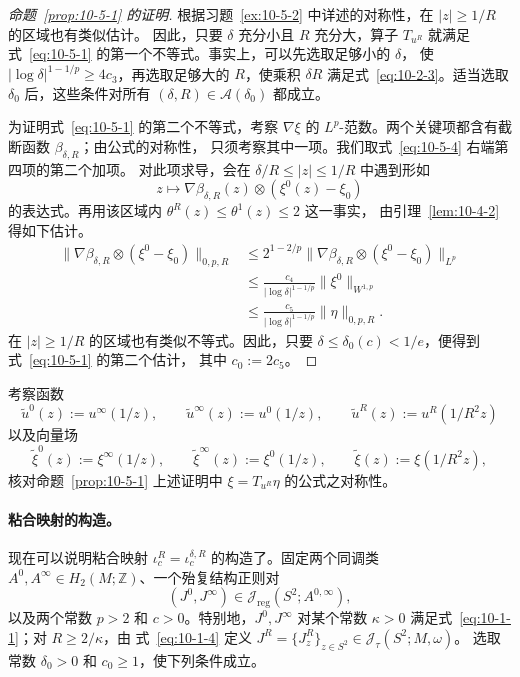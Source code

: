 \begin{proof}[命题~\ref{prop:10-5-1} 的证明]
根据习题~\ref{ex:10-5-2} 中详述的对称性，在 $|z|\ge1/R$ 的区域也有类似估计。
因此，只要 $\delta$ 充分小且 $R$ 充分大，算子 $T_{u^R}$ 就满足
式~\eqref{eq:10-5-1} 的第一个不等式。事实上，可以先选取足够小的 $\delta$，
使 $|\log\delta|^{1-1/p}\ge4c_3$，再选取足够大的 $R$，使乘积 $\delta R$
满足式~\eqref{eq:10-2-3}。适当选取 $\delta_0$ 后，这些条件对所有
$(\delta,R)\in\mathcal A(\delta_0)$ 都成立。

为证明式~\eqref{eq:10-5-1} 的第二个不等式，考察 $\nabla\xi$ 的
$L^p$-范数。两个关键项都含有截断函数 $\beta_{\delta,R}$；由公式的对称性，
只须考察其中一项。我们取式~\eqref{eq:10-5-4} 右端第四项的第二个加项。
对此项求导，会在 $\delta/R\le|z|\le1/R$ 中遇到形如
\[
  z\longmapsto
  \nabla\beta_{\delta,R}(z)\otimes(\xi^0(z)-\xi_0)
\]
的表达式。再用该区域内 $\theta^R(z)\le\theta^1(z)\le2$ 这一事实，
由引理~\ref{lem:10-4-2} 得如下估计。
\[
\begin{aligned}
 \|\nabla\beta_{\delta,R}\otimes(\xi^0-\xi_0)\|_{0,p,R}
 &\le2^{1-2/p}
   \|\nabla\beta_{\delta,R}\otimes(\xi^0-\xi_0)\|_{L^p}\\
 &\le\frac{c_4}{|\log\delta|^{1-1/p}}\|\xi^0\|_{W^{1,p}}\\
 &\le\frac{c_5}{|\log\delta|^{1-1/p}}\|\eta\|_{0,p,R}.
\end{aligned}
\]
在 $|z|\ge1/R$ 的区域也有类似不等式。因此，只要
$\delta\le\delta_0(c)<1/e$，便得到式~\eqref{eq:10-5-1} 的第二个估计，
其中 $c_0:=2c_5$。
\end{proof}

\begin{exercise}\label{ex:10-5-2}
考察函数
\[
  \widetilde u^0(z):=u^\infty(1/z),\qquad
  \widetilde u^\infty(z):=u^0(1/z),\qquad
  \widetilde u^R(z):=u^R(1/R^2z)
\]
以及向量场
\[
  \widetilde\xi^0(z):=\xi^\infty(1/z),\qquad
  \widetilde\xi^\infty(z):=\xi^0(1/z),\qquad
  \widetilde\xi(z):=\xi(1/R^2z),
\]
核对命题~\ref{prop:10-5-1} 上述证明中
$\xi=T_{u^R}\eta$ 的公式之对称性。
\end{exercise}

\paragraph{粘合映射的构造。}
现在可以说明粘合映射
$\iota_c^R=\iota_c^{\delta,R}$ 的构造了。固定两个同调类
$A^0,A^\infty\in H_2(M;\mathbb Z)$、一个殆复结构正则对
\[
  (J^0,J^\infty)\in
  \mathcal J_{\mathrm{reg}}(S^2;A^{0,\infty}),
\]
以及两个常数 $p>2$ 和 $c>0$。特别地，$J^0,J^\infty$ 对某个常数
$\kappa>0$ 满足式~\eqref{eq:10-1-1}；对 $R\ge2/\kappa$，由
式~\eqref{eq:10-1-4} 定义
$J^R=\{J_z^R\}_{z\in S^2}\in\mathcal J_\tau(S^2;M,\omega)$。
选取常数 $\delta_0>0$ 和 $c_0\ge1$，使下列条件成立。

